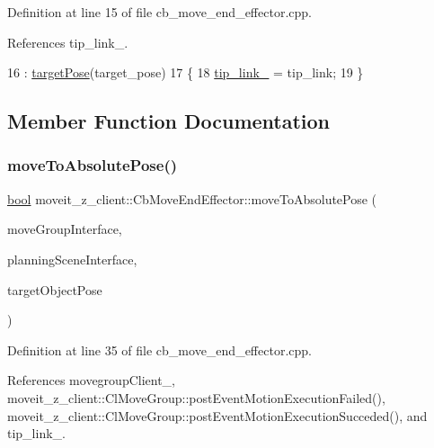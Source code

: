Definition at line 15 of file cb\+\_\+move\+\_\+end\+\_\+effector.\+cpp.



References tip\+\_\+link\+\_\+.


\begin{DoxyCode}
16     : \hyperlink{classmoveit__z__client_1_1CbMoveEndEffector_abea9c6077733077baced34c6098c6140}{targetPose}(target\_pose)
17 \{
18     \hyperlink{classmoveit__z__client_1_1CbMoveEndEffector_abd92e9d3d67bdde11f9e38e0b44a2b8b}{tip\_link\_} = tip\_link;
19 \}
\end{DoxyCode}


\subsection{Member Function Documentation}
\mbox{\label{classmoveit__z__client_1_1CbMoveEndEffector_a4b77954562c23ba6d0aa0f9c805dfd8d}} 
\subsubsection{\texorpdfstring{move\+To\+Absolute\+Pose()}{moveToAbsolutePose()}}
{\footnotesize\ttfamily \hyperlink{classbool}{bool} moveit\+\_\+z\+\_\+client\+::\+Cb\+Move\+End\+Effector\+::move\+To\+Absolute\+Pose (\begin{DoxyParamCaption}\item[{moveit\+::planning\+\_\+interface\+::\+Move\+Group\+Interface \&}]{move\+Group\+Interface,  }\item[{moveit\+::planning\+\_\+interface\+::\+Planning\+Scene\+Interface \&}]{planning\+Scene\+Interface,  }\item[{geometry\+\_\+msgs\+::\+Pose\+Stamped \&}]{target\+Object\+Pose }\end{DoxyParamCaption})\hspace{0.3cm}{\ttfamily [private]}}



Definition at line 35 of file cb\+\_\+move\+\_\+end\+\_\+effector.\+cpp.



References movegroup\+Client\+\_\+, moveit\+\_\+z\+\_\+client\+::\+Cl\+Move\+Group\+::post\+Event\+Motion\+Execution\+Failed(), moveit\+\_\+z\+\_\+client\+::\+Cl\+Move\+Group\+::post\+Event\+Motion\+Execution\+Succeded(), and tip\+\_\+link\+\_\+.



